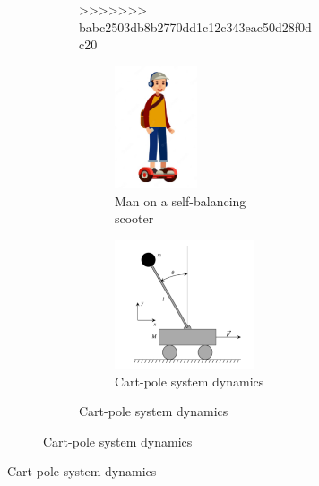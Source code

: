 \documentclass[10pt,a4paper]{article}
\begin{document}
\begin{figure}[H]
\begin{figure}[H]
	\centering
	\begin{subfigure}[b]{0.3\textwidth}
>>>>>>> babc2503db8b2770dd1c12c343eac50d28f0dc20
		\centering
		\begin{subfigure}[b]{0.3\textwidth}
			\centering
			\includegraphics[width=0.5\textwidth]{figure/scooter}
			\caption{Man on a self-balancing scooter}
			\label{fig:scooter}
		\end{subfigure}
		\hfill
		\begin{subfigure}[b]{0.3\textwidth}
			\centering
			\includegraphics[width=0.85\textwidth]{figure/cart-pole}
			\caption{Cart-pole system dynamics}
			\label{fig:cart-pole}
		\end{subfigure}

\end{subfigure}
\end{figure}
\end{figure}
\end{document}
